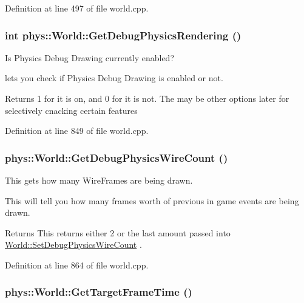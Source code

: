 Definition at line 497 of file world.cpp.

\hypertarget{classphys_1_1World_a92070d16eb81866b4393f0ed96fbcbbc}{
\subsubsection[{GetDebugPhysicsRendering}]{\setlength{\rightskip}{0pt plus 5cm}int phys::World::GetDebugPhysicsRendering ()}}
\label{da/ddf/classphys_1_1World_a92070d16eb81866b4393f0ed96fbcbbc}


Is Physics Debug Drawing currently enabled? 

lets you check if Physics Debug Drawing is enabled or not. \begin{DoxyReturn}{Returns}
1 for it is on, and 0 for it is not. The may be other options later for selectively cnacking certain features 
\end{DoxyReturn}


Definition at line 849 of file world.cpp.

\hypertarget{classphys_1_1World_a1031d596580ac1a8d3593b5be9b49091}{
\subsubsection[{GetDebugPhysicsWireCount}]{ phys::World::GetDebugPhysicsWireCount ()}}
\label{da/ddf/classphys_1_1World_a1031d596580ac1a8d3593b5be9b49091}


This gets how many WireFrames are being drawn. 

This will tell you how many frames worth of previous in game events are being drawn. \begin{DoxyReturn}{Returns}
This returns either 2 or the last amount passed into \hyperlink{classphys_1_1World_a6fa4d1e58a78ba0403af1c003fd321d9}{World::SetDebugPhysicsWireCount} . 
\end{DoxyReturn}


Definition at line 864 of file world.cpp.

\hypertarget{classphys_1_1World_aa063ace52be484c7b03ec5859453f48b}{
\subsubsection[{GetTargetFrameTime}]{ phys::World::GetTargetFrameTime ()}}
\label{da/ddf/classphys_1_1World_aa063ace52be484c7b03ec5859453f48b}


